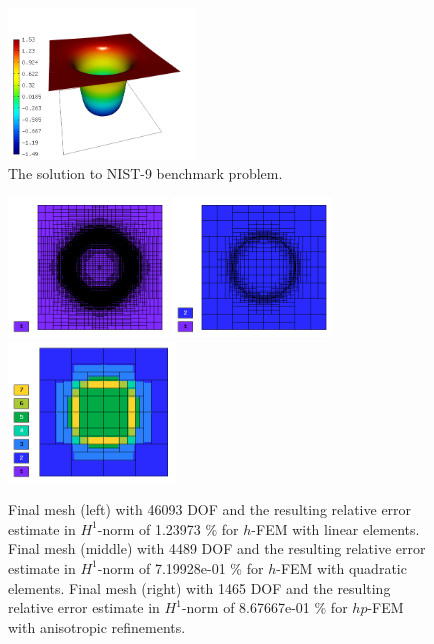 \documentclass[12pt]{elsarticle}
\begin{document}
\begin{figure}[!ht]
\centering
\includegraphics[height=4cm]{nist/nist-9/solution.png}
\caption{The solution to NIST-9 benchmark problem.}
\label{fig:sln-nist09}
\end{figure}

\begin{figure}[!ht]
\centering
\includegraphics[height=3.7cm]{nist/nist-9/mesh_h1_aniso.png}
\includegraphics[height=3.7cm]{nist/nist-9/mesh_h2_aniso.png}
\includegraphics[height=3.7cm]{nist/nist-9/mesh_hp_aniso.png}
\caption{
Final mesh (left) with 46093 DOF and the resulting
relative error estimate in $H^1$-norm of 1.23973 \% for $h$-FEM with linear elements.
Final mesh (middle) with 4489 DOF and the resulting
relative error estimate in $H^1$-norm of 7.19928e-01 \% for $h$-FEM with quadratic elements.
Final mesh (right) with 1465 DOF and the resulting
relative error estimate in $H^1$-norm of 8.67667e-01 \% for $hp$-FEM with anisotropic refinements.}
\label{fig:nist-9-hp-aniso}
\end{figure}
\end{document}

